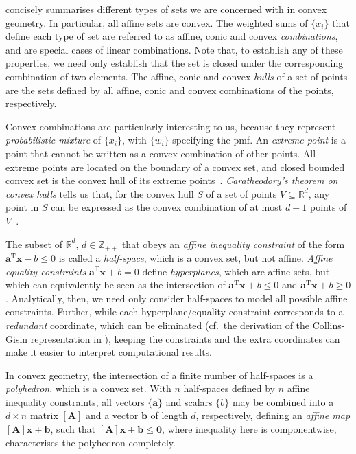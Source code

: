\documentclass[10pt, a4paper]{article}
\numberwithin{equation}{section} %
\theoremstyle{definition}
\theoremstyle{plain}
\newcommand{\?}{\mathrel{?}} %
\newcommand{\Z}{\mathbb{Z}} %
\newcommand{\R}{\mathbb{R}} %
\newcommand{\tpose}{\mathrm{T}}
\newcommand{\cvec}[1]{\boldsymbol{\mathbf{#1}}}    %
\newcommand{\rvec}[1]{\boldsymbol{\mathbf{#1}}^\tpose} %
\newcommand{\matr}[2][]{\left[\mathbf{#2}#1\right]} %
\begin{document}
\begin{appendices}
                           concisely summarises different types of sets we are concerned with in convex geometry. In particular, all affine sets are convex. The weighted sums of \(\{x_i\}\) that define each type of set are referred to as affine, conic and convex \emph{combinations}, and are special cases of linear combinations. Note that, to establish any of these properties, we need only establish that the set is closed under the corresponding combination of two elements. The affine, conic and convex \emph{hulls} of a set of points are the sets defined by all affine, conic and convex combinations of the points, respectively.

                          Convex combinations are particularly interesting to us, because they represent \emph{probabilistic mixture} of \(\{x_i\}\), with \(\{w_i\}\) specifying the pmf. An \emph{extreme point} is a point that cannot be written as a convex combination of other points. All extreme points are located on the boundary of a convex set, and closed bounded convex set is the convex hull of its extreme points~\cite[Ch. B.4]{LuenbergerYe}. \emph{Caratheodory's theorem on convex hulls} tells us that, for the convex hull \(S\) of a set of points \(V \subseteq \R^{d}\), any point in \(S\) can be expressed as the convex combination of at most \(d+1\) points of \(V\)~\cite{Caratheodory,CaratheodorySteinitz}.

                          The subset of \(\R^d\), \(d \in \Z_{++}\) that obeys an \emph{affine inequality constraint} of the form \(\rvec{a}\cvec{x} - b \leq 0\) is called a \emph{half-space}, which is a convex set, but not affine. \emph{Affine equality constraints} \(\rvec{a}\cvec{x} + b = 0\) define \emph{hyperplanes}, which are affine sets, but which can equivalently be seen as the intersection of \(\rvec{a}\cvec{x} + b \leq 0\) and \(\rvec{a}\cvec{x} + b \geq 0\). Analytically, then, we need only consider half-spaces to model all possible affine constraints. Further, while each hyperplane/equality constraint corresponds to a \emph{redundant} coordinate, which can be eliminated (cf.\ the derivation of the Collins-Gisin representation in ), keeping the constraints and the extra coordinates can make it easier to interpret computational results.

                          In convex geometry, the intersection of a finite number of half-spaces is a \emph{polyhedron}, which is a convex set. With \(n\) half-spaces defined by \(n\) affine inequality constraints, all vectors \(\{\cvec{a}\}\) and scalars \(\{b\}\) may be combined into a \(d\times{n}\) matrix \(\matr{A}\) and a vector \(\cvec{b}\) of length \(d\), respectively, defining an \emph{affine map} \(\matr{A}\cvec{x} + \cvec{b}\), such that \(\matr{A}\cvec{x} + \cvec{b} \leq \cvec{0}\), where inequality here is componentwise, characterises the polyhedron completely.


\end{appendices}
\end{document}
